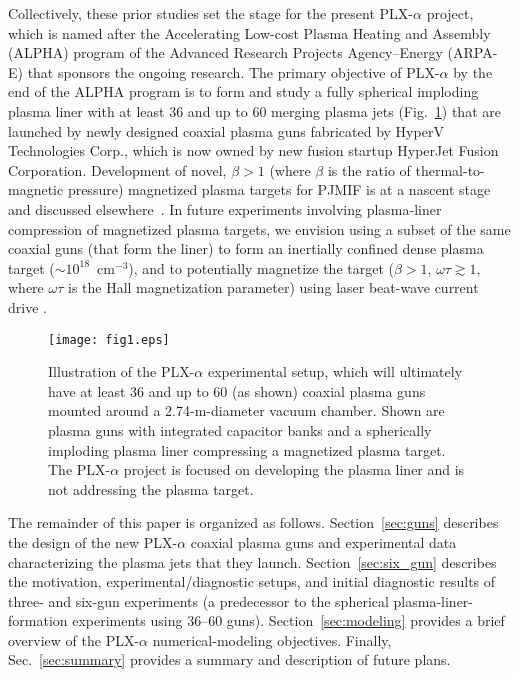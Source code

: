 \documentclass[journal]{IEEEtran}
\begin{document}
Collectively, these prior studies set the stage for the present PLX-$\alpha$ project, which is
named after the Accelerating Low-cost Plasma Heating and Assembly (ALPHA) program of
the Advanced Research Projects Agency--Energy (ARPA-E) that sponsors the ongoing research.
The primary objective of PLX-$\alpha$ by the end of the ALPHA program is
to form and study a fully spherical imploding plasma liner with at least 36 and up to 60 merging
plasma jets (Fig.~\ref{fig:PLX-alpha})
that are launched by newly designed coaxial plasma guns fabricated by
HyperV Technologies Corp., which is now owned by new fusion startup HyperJet Fusion Corporation.
Development of novel, $\beta>1$ (where $\beta$ is the ratio of thermal-to-magnetic pressure)
magnetized plasma targets \cite{ryutov09} for PJMIF is at a nascent stage and discussed
elsewhere~\cite{hsu12ieee,welch12,welch14}.  In future experiments involving plasma-liner 
compression of magnetized plasma targets, we envision using a subset of
the same coaxial guns (that form the liner) to form an inertially confined dense plasma target 
($\sim 10^{18}$~cm$^{-3}$),
and to potentially magnetize the target ($\beta > 1$, $\omega \tau \gtrsim 1$,
where $\omega \tau$ is the Hall magnetization parameter) using laser beat-wave 
current drive \cite{welch12,welch14}.

\begin{figure}[!tb]
\centering
\texttt{[image: fig1.eps]}
\caption{Illustration of the PLX-$\alpha$ experimental setup, which will ultimately 
have at least 36 and up to 60 (as shown)
 coaxial plasma guns mounted around a 2.74-m-diameter vacuum chamber.  Shown are plasma
 guns with integrated capacitor banks and a spherically imploding plasma
 liner compressing a magnetized plasma target.  The PLX-$\alpha$ project is focused on developing 
 the plasma liner and is not addressing the plasma target.}
\label{fig:PLX-alpha}
\end{figure}

The remainder of this paper is organized as follows.  Section~\ref{sec:guns} describes the
design of the new PLX-$\alpha$ coaxial plasma guns and experimental data characterizing
the plasma jets that they launch.  Section~\ref{sec:six_gun} describes the motivation,
experimental/diagnostic setups, and 
initial diagnostic results of three- and six-gun experiments (a predecessor to the spherical
plasma-liner-formation experiments using 36--60 guns).  Section~\ref{sec:modeling}
provides a brief overview of the PLX-$\alpha$ numerical-modeling objectives.  Finally, Sec.~\ref{sec:summary} provides a summary and
description of future plans.
\end{document}
